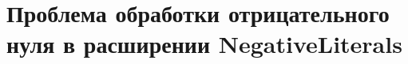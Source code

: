 \chapter[Проблема в расширении NegativeLiterals]
{Проблема обработки отрицательного нуля в расширении NegativeLiterals}

